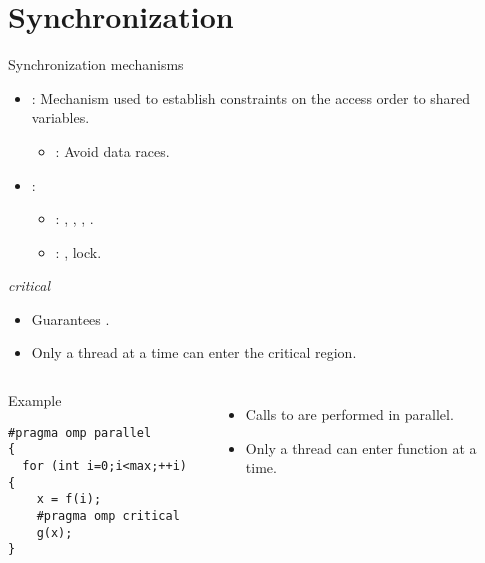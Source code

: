 \section{Synchronization}

\begin{frame}[t]{Synchronization mechanisms}
\begin{itemize}
  \item {}: 
        Mechanism used to establish constraints on the access order
        to shared variables.
    \begin{itemize}
      \item {}: Avoid data races.
    \end{itemize}

  \item {}:
    \begin{itemize}
      \item {}: , , , .
      \item {}: , lock.
    \end{itemize}
\end{itemize}
\end{frame}

\begin{frame}[t,fragile]{\emph{critical}}
\begin{itemize}
  \item Guarantees .
  \item Only a thread at a time can enter the critical region.
\end{itemize}

\begin{columns}

\begin{block}{Example}
\begin{lstlisting}
#pragma omp parallel
{
  for (int i=0;i<max;++i) {
    x = f(i);
    #pragma omp critical
    g(x);
}
\end{lstlisting}
\end{block}

\begin{itemize}
  \item Calls to  are performed in parallel.
  \item Only a thread can enter function  at a time.
\end{itemize}

\end{columns}
\end{frame}

